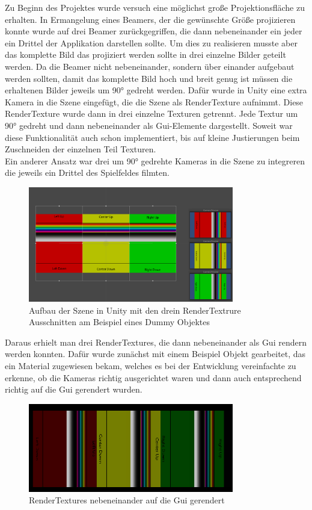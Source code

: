 
Zu Beginn des Projektes wurde versuch eine möglichst große Projektionsfläche zu erhalten. In Ermangelung eines Beamers, der die gewünschte Größe projizieren konnte wurde auf drei Beamer zurückgegriffen, die dann nebeneinander ein jeder ein Drittel der Applikation darstellen sollte. Um dies zu realisieren musste aber das komplette Bild das projiziert werden sollte in drei einzelne Bilder geteilt werden. Da die Beamer nicht nebeneinander, sondern über einander aufgebaut werden sollten, damit das komplette Bild hoch und breit genug ist müssen die erhaltenen Bilder jeweils um 90° gedreht werden. Dafür wurde in Unity eine extra Kamera in die Szene eingefügt, die die Szene als RenderTexture aufnimmt. Diese RenderTexture wurde dann in drei einzelne Texturen getrennt. Jede Textur um 90° gedreht und dann nebeneinander als Gui-Elemente dargestellt. Soweit war diese Funktionalität auch schon implementiert, bis auf kleine Justierungen beim Zuschneiden der einzelnen Teil Texturen. \\
Ein anderer Ansatz war drei um 90° gedrehte Kameras in die Szene zu integreren die jeweils ein Drittel des Spielfeldes filmten. 
\begin{figure}[htbp]
	\centering
		\includegraphics[width=0.8\textwidth]{images/RenderTextureBeispielSzene.PNG}
	\caption{Aufbau der Szene in Unity mit den drein RenderTextrure Ausschnitten am Beispiel eines Dummy Objektes}
	\label{fig:RenderTextureBeispielSzene}
\end{figure}
Daraus erhielt man drei RenderTextures, die dann nebeneinander als Gui rendern werden konnten. Dafür wurde zunächst mit einem Beispiel Objekt gearbeitet, das ein Material zugewiesen bekam, welches es bei der Entwicklung vereinfachte zu erkenne, ob die Kameras richtig ausgerichtet waren und dann auch entsprechend richtig auf die Gui gerendert wurden. 
\begin{figure}[htbp]
	\centering
		\includegraphics[width=0.8\textwidth]{images/RenderTexturesAlsGui.PNG}
	\caption{RenderTextures nebeneinander auf die Gui gerendert}
	\label{fig:RenderTexturesAlsGui}
\end{figure}\\
